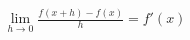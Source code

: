 \documentclass[preview]{standalone}
\begin{document}
\begin{align*}
\lim_{h \to 0} \frac{f(x+h) - f(x)}{h} = f'(x)
\end{align*}
\end{document}
